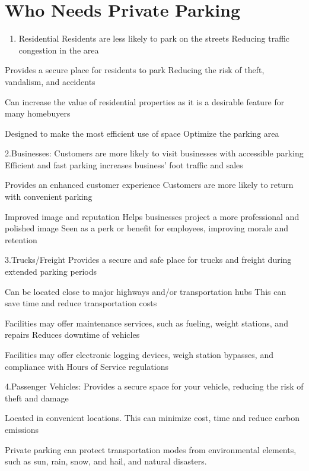 \documentclass[
]{book}
\providecommand{\tightlist}{%
  \setlength{\itemsep}{0pt}\setlength{\parskip}{0pt}}
\begin{document}
\hypertarget{parking-needs}{%
\section{Who Needs Private Parking}\label{parking-needs}}

\begin{enumerate}
\def\labelenumi{\arabic{enumi}.}
\tightlist
\item
  Residential
  Residents are less likely to park on the streets
  Reducing traffic congestion in the area
\end{enumerate}

Provides a secure place for residents to park
Reducing the risk of theft, vandalism, and accidents

Can increase the value of residential properties as it is a desirable feature for many homebuyers

Designed to make the most efficient use of space
Optimize the parking area

2.Businesses:
Customers are more likely to visit businesses with accessible parking
Efficient and fast parking increases business' foot traffic and sales

Provides an enhanced customer experience
Customers are more likely to return with convenient parking

Improved image and reputation
Helps businesses project a more professional and polished image
Seen as a perk or benefit for employees, improving morale and retention

3.Trucks/Freight
Provides a secure and safe place for trucks and freight during extended parking periods

Can be located close to major highways and/or transportation hubs
This can save time and reduce transportation costs

Facilities may offer maintenance services, such as fueling, weight stations, and repairs
Reduces downtime of vehicles

Facilities may offer electronic logging devices, weigh station bypasses, and compliance with Hours of Service regulations

4.Passenger Vehicles:
Provides a secure space for your vehicle, reducing the risk of theft and damage

Located in convenient locations. This can minimize cost, time and reduce carbon emissions

Private parking can protect transportation modes from environmental elements, such as sun, rain, snow, and hail, and natural disasters.
\end{document}
